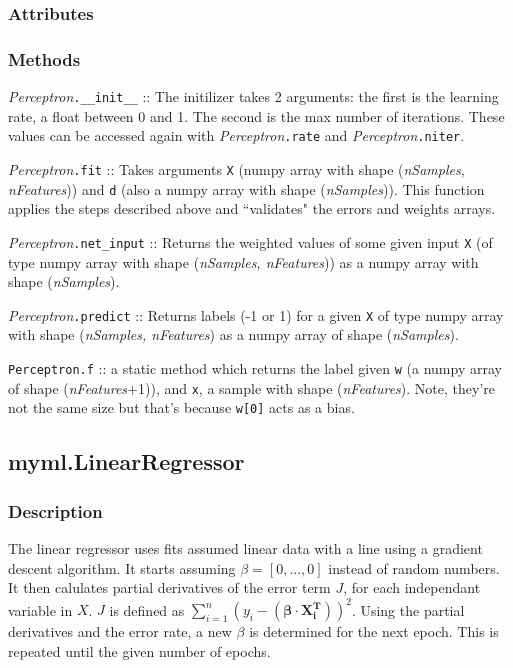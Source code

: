 \documentclass{article}
\begin{document}
\subsubsection{Attributes}

\subsubsection{Methods}

\textit{Perceptron}\texttt{.\_\_init\_\_} :: The initilizer takes 2 arguments: the
first is the learning rate, a float between 0 and 1. The second is the max
number of iterations. These values can be accessed again with
\textit{Perceptron}\texttt{.rate} and \textit{Perceptron}\texttt{.niter}.

\textit{Perceptron}\texttt{.fit} :: Takes arguments \texttt{X} (numpy array
with shape (\textit{nSamples}, \textit{nFeatures})) and \texttt{d} (also a
numpy array with shape (\textit{nSamples})). This function applies the steps
described above and ``validates" the errors and weights arrays.

\textit{Perceptron}\texttt{.net\_input} :: Returns the weighted values of some
given input \texttt{X} (of type numpy array with shape
(\textit{nSamples, nFeatures})) as a numpy array with shape (\textit{nSamples}).

\textit{Perceptron}\texttt{.predict} :: Returns labels (-1 or 1) for a given
\texttt{X} of type numpy array with shape (\textit{nSamples, nFeatures}) as a
numpy array of shape (\textit{nSamples}).

\texttt{Perceptron.f} :: a static method which returns the label given
\texttt{w} (a numpy array of shape (\textit{nFeatures}+1)), and \texttt{x}, a
sample with shape (\textit{nFeatures}). Note, they're not the same size but
that's because \texttt{w[0]} acts as a bias.

\subsection{myml.LinearRegressor}

\subsubsection{Description}

The linear regressor uses fits assumed linear data with a line using a gradient
descent algorithm. It starts assuming $\beta = [0, ..., 0]$ instead of random
numbers. It then calulates partial derivatives of the error term $J$, for each
independant variable in $X$. $J$ is defined as $\sum_{i=1}^{n}(y_i-(\mathbf{\beta}\cdot\mathbf{X^T_i}))^2$.
Using the partial derivatives and the error rate, a new $\beta$ is determined for
the next epoch. This is repeated until the given number of epochs.
\end{document}
